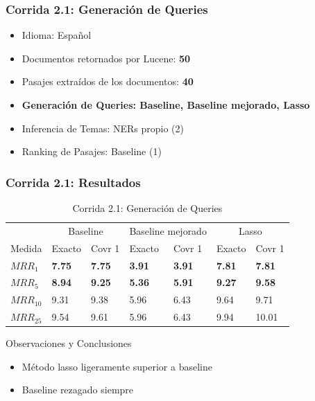 \begin{frame}
\frametitle{Corrida 2.1: Generación de Queries}

\begin{itemize}
  \item Idioma: Español
  \item Documentos retornados por Lucene: \textbf{50}
  \item Pasajes extraídos de los documentos: \textbf{40}
  \item \textbf{{\color{blue}Generación de Queries: Baseline, Baseline mejorado, Lasso}}
  \item Inferencia de Temas: NERs propio (2)
  \item Ranking de Pasajes: Baseline (1)
\end{itemize}

\end{frame}

\begin{frame}
\frametitle{Corrida 2.1: Resultados}


\begin{table}
\centering
\begin{center}
\begin{tabular}{|l | l | l | l | l | l | l |}

& \multicolumn{2}{|c|}{Baseline} & \multicolumn{2}{|c|}{Baseline mejorado} & \multicolumn{2}{|c|}{Lasso}\\ 
Medida & Exacto & Covr 1 & Exacto & Covr 1 & Exacto & Covr 1 \\ 

\textbf{$MRR_{1}$} & \textbf{7.75} & \textbf{7.75} &  \textbf{3.91} & \textbf{3.91} & \textbf{{\color{green}7.81}} & \textbf{{\color{green}7.81}} \\ 
$MRR_{5}$ & \textbf{8.94} & \textbf{9.25} &  \textbf{5.36} & \textbf{5.91} & \textbf{9.27} & \textbf{9.58}   \\ 
$MRR_{10}$ & 9.31 & 9.38 &  5.96 & 6.43 & 9.64 & 9.71   \\ 
$MRR_{25}$ & 9.54 & 9.61 &  5.96 & 6.43 & 9.94 & 10.01  \\ 
\end{tabular}

\caption{Corrida 2.1: Generación de Queries}
\end{center}
\end{table}

Observaciones y Conclusiones
\begin{itemize}
  \item Método lasso ligeramente superior a baseline
  \item Baseline  rezagado siempre
\end{itemize}

\end{frame}


